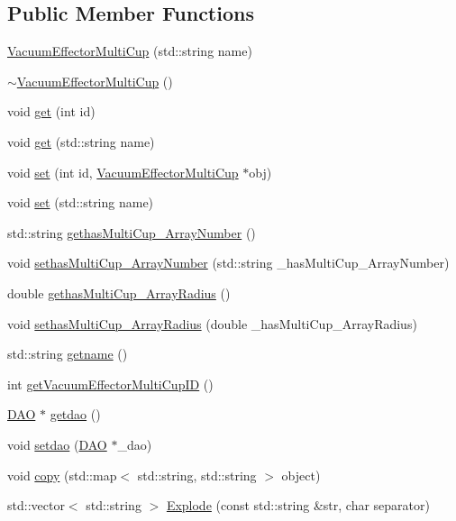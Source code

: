 \subsection*{Public Member Functions}
\begin{DoxyCompactItemize}
\item 
\hyperlink{class_vacuum_effector_multi_cup_abeb10391ad90954c37049ed102cc7f10}{VacuumEffectorMultiCup} (std::string name)
\item 
\hyperlink{class_vacuum_effector_multi_cup_ac94d79ed87539a35bba494de6a6f7fd1}{$\sim$VacuumEffectorMultiCup} ()
\item 
void \hyperlink{class_vacuum_effector_multi_cup_a9572b300d529c6615a1e954d78d2242b}{get} (int id)
\item 
void \hyperlink{class_vacuum_effector_multi_cup_a414494076a456ad84adf4784e1c216d7}{get} (std::string name)
\item 
void \hyperlink{class_vacuum_effector_multi_cup_ac16abc64ee07b3ce7280ea0bb9e01be4}{set} (int id, \hyperlink{class_vacuum_effector_multi_cup}{VacuumEffectorMultiCup} $\ast$obj)
\item 
void \hyperlink{class_vacuum_effector_multi_cup_aa7253cced1f92a70310016053a5101f3}{set} (std::string name)
\item 
std::string \hyperlink{class_vacuum_effector_multi_cup_ad75725125a5a4885a4435ca5f446cd3d}{gethasMultiCup\_\-ArrayNumber} ()
\item 
void \hyperlink{class_vacuum_effector_multi_cup_a9b79d6b9666fcf06cf30bbf19ffb1404}{sethasMultiCup\_\-ArrayNumber} (std::string \_\-hasMultiCup\_\-ArrayNumber)
\item 
double \hyperlink{class_vacuum_effector_multi_cup_a739a88fa46c3244da8ff7181116819d6}{gethasMultiCup\_\-ArrayRadius} ()
\item 
void \hyperlink{class_vacuum_effector_multi_cup_acfa00d963ca2f276d8358811aac1fd42}{sethasMultiCup\_\-ArrayRadius} (double \_\-hasMultiCup\_\-ArrayRadius)
\item 
std::string \hyperlink{class_vacuum_effector_multi_cup_a3b98a7a4ab4d4a86c8f917e9bbb3c539}{getname} ()
\item 
int \hyperlink{class_vacuum_effector_multi_cup_a93a94b7dc82bcf456b8a15f743cd48f5}{getVacuumEffectorMultiCupID} ()
\item 
\hyperlink{class_d_a_o}{DAO} $\ast$ \hyperlink{class_vacuum_effector_multi_cup_a784d66a07083715cb21841c20bccb1b9}{getdao} ()
\item 
void \hyperlink{class_vacuum_effector_multi_cup_a456f13578045a671159a7338b5dd2c46}{setdao} (\hyperlink{class_d_a_o}{DAO} $\ast$\_\-dao)
\item 
void \hyperlink{class_vacuum_effector_multi_cup_a4fc22178c8e73ce173566e34a451843c}{copy} (std::map$<$ std::string, std::string $>$ object)
\item 
std::vector$<$ std::string $>$ \hyperlink{class_vacuum_effector_multi_cup_acb7d89807c0207aaa7399b16667cb1a4}{Explode} (const std::string \&str, char separator)
\end{DoxyCompactItemize}


